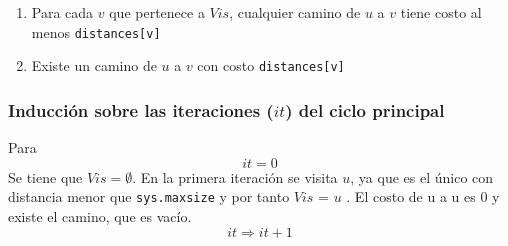\documentclass[a4paper,12pt,twocolumn]{article}
\begin{document}
		\begin{enumerate}
			\item Para cada $v$ que pertenece a $Vis$, cualquier camino de $u$ a $v$ tiene costo al menos  \texttt{\ttfamily distances[v]}
			\item Existe un camino de $u$ a $v$ con costo \texttt{\ttfamily distances[v]}
		\end{enumerate}
		\subsubsection{Inducción sobre las iteraciones ($it$) del ciclo principal}
		Para $$it = 0$$
		Se tiene que $Vis = \emptyset$. En la primera iteración se visita $u$, ya que es el único con distancia menor que \texttt{\ttfamily sys.maxsize} y por tanto $Vis$ = { $u$ }. El costo de u a u es 0 y existe el camino, que es vacío.\\
			
			$$it \Rightarrow it + 1$$\\
			
\end{document}
